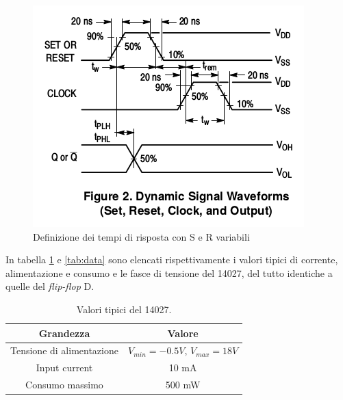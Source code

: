 \documentclass[journal, a4paper]{IEEEtran}
\begin{document}
\begin{figure}[htp]
\centering
\includegraphics[scale=.4]{srtimes}
\caption{Definizione dei tempi di risposta con S e R variabili}
\label{fig:srtimes}
\end{figure}

In tabella \ref{tab:val} e \ref{tab:data} sono elencati rispettivamente i valori tipici di corrente, alimentazione e consumo e le fasce di tensione del 14027, del tutto identiche a quelle del \emph{flip-flop} D.

\begin{table}[htp]
\centering
\caption{Valori tipici del 14027.}
\label{tab:val}
\begin{tabular}{|c|c|}
\hline 
Grandezza & Valore \\ 
\hline 
Tensione di alimentazione & $V_{min} = -0.5 V$, $V_{max} = 18 V$ \\ 
\hline 
Input current & 10 mA \\ 
\hline 
Consumo massimo & 500 mW \\ 
\hline 
\end{tabular} 
\end{table}
\end{document}
